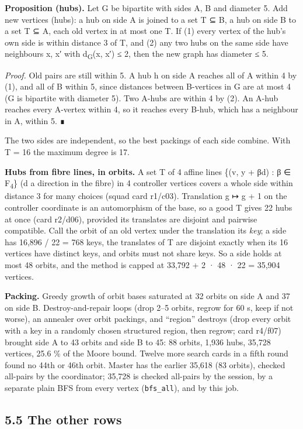\documentclass[
  10pt,
]{article}
\begin{document}
\textbf{Proposition (hubs).} Let G be bipartite with sides A, B and diameter 5. Add new vertices (hubs): a hub on side
A is joined to a set T ⊆ B, a hub on side B to a set T ⊆ A, each old vertex in at most one T. If (1) every vertex of
the hub's own side is within distance 3 of T, and (2) any two hubs on the same side have neighbours x, x′ with
d\textsubscript{G}(x, x′) ≤ 2, then the new graph has diameter ≤ 5.

\emph{Proof.} Old pairs are still within 5. A hub h on side A reaches all of A within 4 by (1), and all of B within 5,
since distances between B-vertices in G are at most 4 (G is bipartite with diameter 5). Two A-hubs are within 4 by
(2). An A-hub reaches every A-vertex within 4, so it reaches every B-hub, which has a neighbour in A, within 5. ∎

The two sides are independent, so the best packings of each side combine. With \textbar T\textbar{} = 16 the maximum
degree is 17.

\textbf{Hubs from fibre lines, in orbits.} A set T of 4 affine lines \{(v, y + βd) : β ∈ F\textsubscript{4}\} (d a
direction in the fibre) in 4 controller vertices covers a whole side within distance 3 for many choices (squad card
r1/c03). Translation g ↦ g + 1 on the controller coordinate is an automorphism of the base, so a good T gives 22 hubs
at once (card r2/d06), provided its translates are disjoint and pairwise compatible. Call the orbit of an old vertex
under the translation its \emph{key}; a side has 16,896 / 22 = 768 keys, the translates of T are disjoint exactly when
its 16 vertices have distinct keys, and orbits must not share keys. So a side holds at most 48 orbits, and the method
is capped at 33,792 + 2 · 48 · 22 = 35,904 vertices.

\textbf{Packing.} Greedy growth of orbit bases saturated at 32 orbits on side A and 37 on side B. Destroy-and-repair
loops (drop 2--5 orbits, regrow for 60 s, keep if not worse), an annealer over orbit packings, and ``region'' destroys
(drop every orbit with a key in a randomly chosen structured region, then regrow; card r4/f07) brought side A to 43
orbits and side B to 45: 88 orbits, 1,936 hubs, 35,728 vertices, 25.6 \% of the Moore bound. Twelve more search cards
in a fifth round found no 44th or 46th orbit. Master has the earlier 35,618 (83 orbits), checked all-pairs by the
coordinator; 35,728 is checked all-pairs by the session, by a separate plain BFS from every vertex
(\texttt{bfs\_\allowbreak{}all}), and by this job.

\hypertarget{the-other-rows}{%
\subsection{5.5 The other rows}\label{the-other-rows}}
\end{document}
